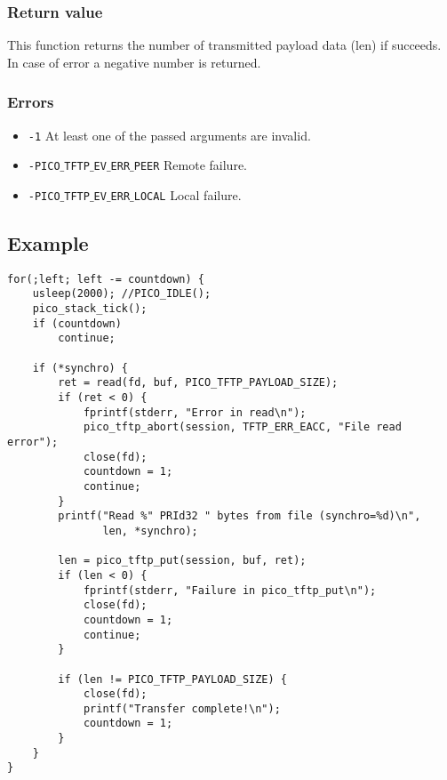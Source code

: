 \subsubsection*{Return value}
This function returns the number of transmitted payload data (len) if succeeds. In case of error a negative number is returned.

\subsubsection*{Errors}
\begin{itemize}[noitemsep]
\item \texttt{-1} At least one of the passed arguments are invalid.
\item \texttt{-PICO$\_$TFTP$\_$EV$\_$ERR$\_$PEER} Remote failure.
\item \texttt{-PICO$\_$TFTP$\_$EV$\_$ERR$\_$LOCAL} Local failure.
\end{itemize}

\subsection*{Example}
\begin{verbatim}
for(;left; left -= countdown) {
    usleep(2000); //PICO_IDLE();
    pico_stack_tick();
    if (countdown)
        continue;

    if (*synchro) {
        ret = read(fd, buf, PICO_TFTP_PAYLOAD_SIZE);
        if (ret < 0) {
            fprintf(stderr, "Error in read\n");
            pico_tftp_abort(session, TFTP_ERR_EACC, "File read error");
            close(fd);
            countdown = 1;
            continue;
        }
        printf("Read %" PRId32 " bytes from file (synchro=%d)\n",
               len, *synchro);

        len = pico_tftp_put(session, buf, ret);
        if (len < 0) {
            fprintf(stderr, "Failure in pico_tftp_put\n");
            close(fd);
            countdown = 1;
            continue;
        }

        if (len != PICO_TFTP_PAYLOAD_SIZE) {
            close(fd);
            printf("Transfer complete!\n");
            countdown = 1;
        }
    }
}
\end{verbatim}
